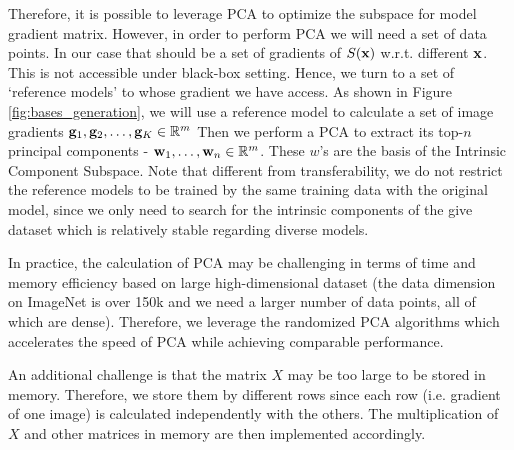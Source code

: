 Therefore, it is possible to leverage PCA to optimize the subspace for model gradient matrix. However, in order to perform PCA we will need a set of data points. In our case that should be a set of gradients of $S({\bf x})$ w.r.t. different $\bf x$. This is not accessible under black-box setting. Hence, we turn to a set of `reference models' to whose gradient we have access. As shown in Figure \ref{fig:bases_generation}, we will use a reference model to calculate a set of image gradients ${\bf g}_1, {\bf g}_2, \ldots, {\bf g}_K \in \mathbb{R}^m$ Then we perform a PCA to extract its top-$n$ principal components - ${\bf w}_1, \ldots, {\bf w}_n \in \mathbb{R}^m$. These $w$'s are the basis of the Intrinsic Component Subspace.
Note that different from transferability, we do not restrict the reference models to be trained by the same training data with the original model, since we only need to search for the intrinsic components of the give dataset which is relatively stable regarding diverse models.


In practice, the calculation of PCA may be challenging in terms of time and memory efficiency based on large high-dimensional dataset (the data dimension on ImageNet is over 150k and we need a larger number of data points, all of which are dense). Therefore, we leverage the randomized PCA algorithms\cite{halko2011finding} which accelerates the speed of PCA while achieving comparable performance.

An additional challenge is that the matrix $X$ may be too large to be stored in memory. Therefore, we store them by different rows since each row (i.e. gradient of one image) is calculated independently with the others. The multiplication of $X$ and other matrices in memory are then implemented accordingly.


